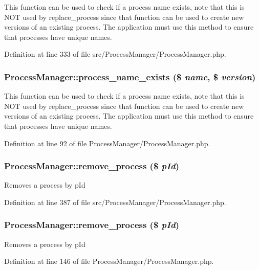 This function can be used to check if a process name exists, note that this is NOT used by replace\_\-process since that function can be used to create new versions of an existing process. The application must use this method to ensure that processes have unique names. 

Definition at line 333 of file src/Process\-Manager/Process\-Manager.php.
\subsubsection{\setlength{\rightskip}{0pt plus 5cm}Process\-Manager::process\_\-name\_\-exists (\$ {\em name}, \$ {\em version})}\label{classProcessManager_a4}


This function can be used to check if a process name exists, note that this is NOT used by replace\_\-process since that function can be used to create new versions of an existing process. The application must use this method to ensure that processes have unique names. 

Definition at line 92 of file Process\-Manager/Process\-Manager.php.
\subsubsection{\setlength{\rightskip}{0pt plus 5cm}Process\-Manager::remove\_\-process (\$ {\em p\-Id})}\label{classProcessManager_a20}


Removes a process by p\-Id 

Definition at line 387 of file src/Process\-Manager/Process\-Manager.php.
\subsubsection{\setlength{\rightskip}{0pt plus 5cm}Process\-Manager::remove\_\-process (\$ {\em p\-Id})}\label{classProcessManager_a7}


Removes a process by p\-Id 

Definition at line 146 of file Process\-Manager/Process\-Manager.php.
